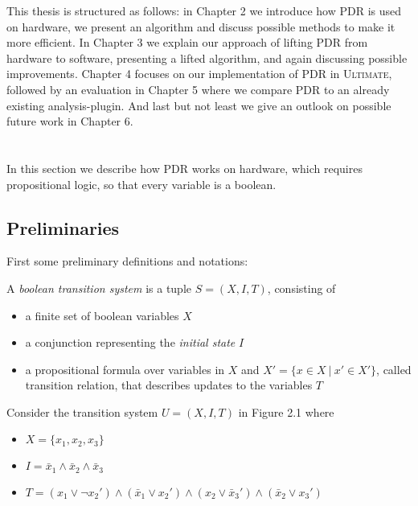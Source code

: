 \documentclass[11pt, a4paper, BCOR=10mm, ngerman]{scrbook}
\begin{document}
This thesis is structured as follows: in Chapter 2 we introduce how PDR is used on hardware, we present an algorithm and discuss possible methods to make it more efficient. In Chapter 3 we explain our approach of lifting PDR from hardware to software, presenting a lifted algorithm, and again discussing possible improvements. Chapter 4 focuses on our implementation of PDR in \textsc{Ultimate}, followed by an evaluation in Chapter 5 where we compare PDR to an already existing analysis-plugin. And last but not least we give an outlook on possible future work in Chapter 6.



\chapter{}
\label{PDR}
In this section we describe how PDR works on hardware, which requires propositional logic, so that every variable is a boolean.



\section{Preliminaries} \vspace{-5mm}
First some preliminary definitions and notations:  \par

A \textsl{boolean transition system} is a tuple $S = (X, I, T)$, consisting of
\begin{itemize}
	\item a finite set of boolean variables $X$
	\item a conjunction representing the \textsl{initial state} $I$
	\item a propositional formula over variables in $X$ and $X' = \{x \in X \ | \ x' \in X'\}$, called transition relation, that describes updates to the variables $T$
\end{itemize}
\par
Consider the transition system $U = (X, I, T)$ in Figure 2.1 where
\begin{itemize}
	\item $ X= \{x_1, x_2, x_3\}$
	\item $I = \bar x_1 \land \bar x_2 \land \bar x_3$
	\item $T = (x_1 \lor \neg x_2' ) \land ( \bar x_1 \lor x_2') \land (x_2 \lor \bar x_3') \land ( \bar x_2 \lor x_3')$
\end{itemize}
\pagebreak
\end{document}
